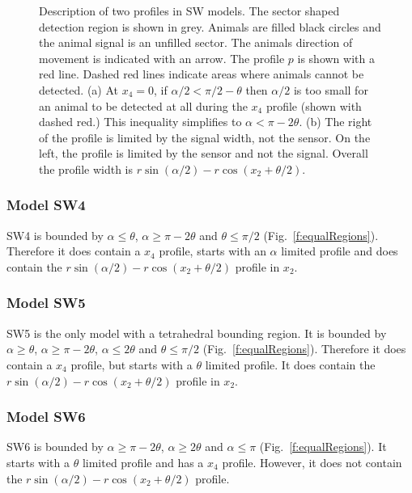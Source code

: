 \begin{figure}[t]
\caption{Description of two profiles in SW models. The sector shaped detection region is shown in grey. Animals are filled black circles and the animal signal is an unfilled sector. The animals direction of movement is indicated with an arrow. The profile $p$ is shown with a red line. Dashed red lines indicate areas where animals cannot be detected. (a) At $x_4 = 0$, if $\alpha/2 < \pi/2 - \theta$ then $\alpha/2$ is too small for an animal to be detected at all during the $x_4$ profile (shown with dashed red.) This inequality simplifies to $\alpha < \pi - 2\theta$. (b) The right of the profile is limited by the signal width, not the sensor. On the left, the profile is limited by the sensor and not the signal. Overall the profile width is $r\sin(\alpha/2) - r\cos(x_2 + \theta/2)$.     }
\label{f:SW4--9}
\end{figure}

\subsubsection{Model SW4} \label{SW4}

SW4 is bounded by $\alpha \le \theta$, $\alpha \ge \pi - 2\theta$ and $\theta \le \pi/2$ (Fig.~\ref{f:equalRegions}). Therefore it does contain a $x_4$ profile, starts with an $\alpha$ limited profile and does contain the $r\sin(\alpha/2) - r\cos(x_2 + \theta/2)$ profile in $x_2$.



\subsubsection{Model SW5} \label{SW5}

SW5 is the only model with a tetrahedral bounding region. It is bounded by $\alpha \ge \theta$, $\alpha \ge \pi - 2\theta$, $\alpha \le 2\theta$ and $\theta \le \pi/2$ (Fig.~\ref{f:equalRegions}). Therefore it does contain a $x_4$ profile, but starts with a $\theta$ limited profile. It does contain the $r\sin(\alpha/2) - r\cos(x_2 + \theta/2)$ profile in $x_2$.



\subsubsection{Model SW6} \label{SW6}

SW6 is bounded by $\alpha \ge \pi - 2\theta$,  $\alpha \ge 2\theta$ and $\alpha \le \pi$ (Fig.~\ref{f:equalRegions}). It starts with a $\theta$ limited profile and has a $x_4$ profile. However, it does not contain the $r\sin(\alpha/2) - r\cos(x_2 + \theta/2)$ profile.

